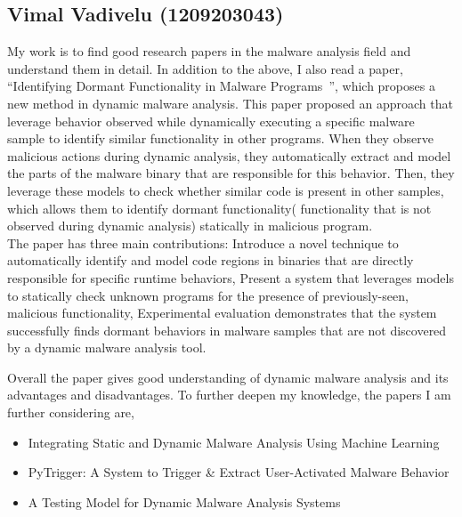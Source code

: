 \documentclass[16pt]{article}
\begin{document}
		\subsection{Vimal Vadivelu (1209203043)}
		My work is to find good research papers in the malware analysis field and understand them in detail. In addition to the above, I also read a paper, “Identifying Dormant Functionality in Malware Programs~\cite{comparetti2010identifying}”, which proposes a new method in dynamic malware analysis. 
		This paper proposed an approach that leverage behavior observed while dynamically executing a specific malware sample to identify similar functionality in other programs. When they observe malicious actions during dynamic analysis, they automatically extract and model the parts of the malware binary that are responsible for this behavior. Then, they leverage these models to check whether similar code is present in other samples, which allows them to identify dormant functionality( functionality that is not observed during dynamic analysis) statically in malicious program.\\
		The paper has three main contributions:
		Introduce a novel technique to automatically identify and model code regions in binaries that are directly responsible for specific runtime behaviors,
		Present a system that leverages models to statically check unknown programs for the presence of previously-seen, malicious functionality,
		Experimental evaluation demonstrates that the system successfully finds dormant behaviors in malware samples that are not discovered by a dynamic malware analysis tool.
		
		
		Overall the paper gives good understanding of dynamic malware analysis and its advantages and disadvantages. To further deepen my knowledge, the papers I am further considering are,
		\begin{itemize}
			\item Integrating Static and Dynamic Malware Analysis Using Machine Learning~\cite{mangialardo2015integrating}
			\item PyTrigger: A System to Trigger \& Extract User-Activated Malware Behavior~\cite{fleck2013pytrigger}
			\item A Testing Model for Dynamic Malware Analysis Systems~\cite{massicotte2012testing}
		\end{itemize}
		
\end{document}
